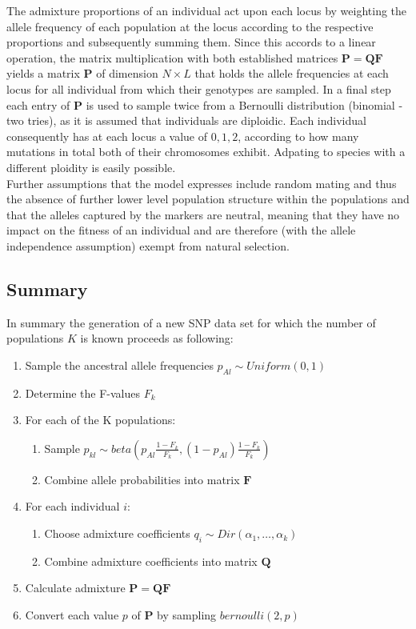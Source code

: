 \documentclass[a4paper, 11pt]{article}
\begin{document}
The admixture proportions of an individual act upon each locus by weighting the allele frequency of each population at the locus according to the respective proportions and subsequently summing them. Since this accords to a linear operation, the matrix multiplication with both established matrices $\mathbf{P} = \mathbf{Q}\mathbf{F}$ yields a matrix $\mathbf{P}$ of dimension $N \times L$ that holds the allele frequencies at each locus for all individual from which their genotypes are sampled. In a final step each entry of $\mathbf{P}$ is used to sample twice from a Bernoulli distribution (binomial - two tries), as it is assumed that individuals are diploidic. Each individual consequently has at each locus a value of $0, 1, 2$, according to how many mutations in total both of their chromosomes exhibit. Adpating to species with a different ploidity is easily possible.\\

Further assumptions that the model expresses include random mating and thus the absence of further lower level population structure within the populations and that the alleles captured by the markers are neutral, meaning that they have no impact on the fitness of an individual and are therefore (with the allele independence assumption) exempt from natural selection.

\subsection{Summary}
In summary the generation of a new SNP data set for which the number of populations $K$ is known proceeds as following:
\begin{enumerate}
\item Sample the ancestral allele frequencies $p_{Al} \sim Uniform(0, 1)$
\item Determine the F-values $F_k$
\item  For each of the K populations:
\begin{enumerate}
\item Sample $p_{kl} \sim beta(p_{Al} \frac{1 - F_k}{F_k}, (1-p_{Al}) \frac{1 - F_k}{F_k})$
\item Combine allele probabilities into matrix $\mathbf{F}$
\end{enumerate} 
\item For each individual $i$:
\begin{enumerate}
\item Choose admixture coefficients $q_i \sim Dir(\alpha_1, \ldots, \alpha_k)$
\item Combine admixture coefficients into matrix $\mathbf{Q}$
\end{enumerate}
\item Calculate admixture $\mathbf{P} = \mathbf{Q}\mathbf{F}$
\item Convert each value $p$ of $\mathbf{P}$ by sampling $bernoulli(2, p)$
\end{enumerate}
\end{document}
